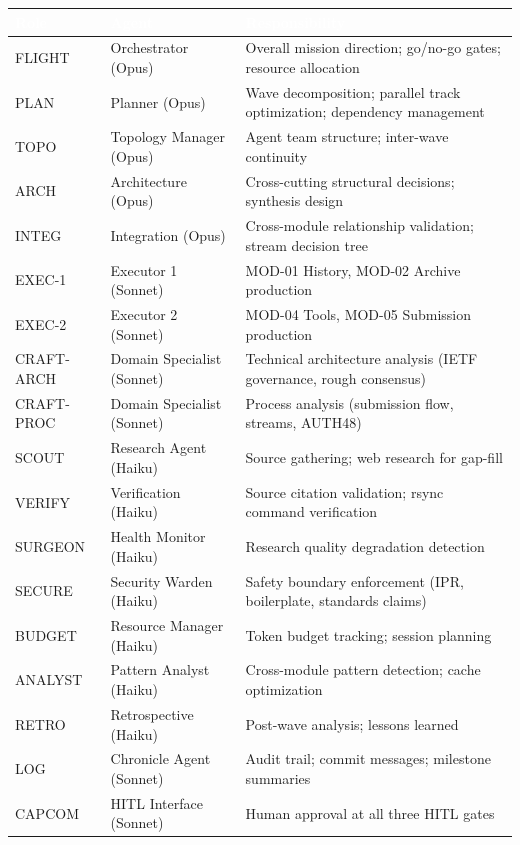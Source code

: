 \documentclass[11pt,letterpaper]{article}
\newcommand{\tableheader}[1]{\textbf{\sffamily\textcolor{white}{#1}}}
\begin{document}
\begin{center}
\begin{tabularx}{\textwidth}{L{2cm}L{3.5cm}X}
\toprule
{}
\tableheader{Role} & \tableheader{Agent} & \tableheader{Responsibility} \\
\midrule
FLIGHT & Orchestrator (Opus) & Overall mission direction; go/no-go gates; resource allocation \\
PLAN & Planner (Opus) & Wave decomposition; parallel track optimization; dependency management \\
TOPO & Topology Manager (Opus) & Agent team structure; inter-wave continuity \\
ARCH & Architecture (Opus) & Cross-cutting structural decisions; synthesis design \\
INTEG & Integration (Opus) & Cross-module relationship validation; stream decision tree \\
EXEC-1 & Executor 1 (Sonnet) & MOD-01 History, MOD-02 Archive production \\
EXEC-2 & Executor 2 (Sonnet) & MOD-04 Tools, MOD-05 Submission production \\
CRAFT-ARCH & Domain Specialist (Sonnet) & Technical architecture analysis (IETF governance, rough consensus) \\
CRAFT-PROC & Domain Specialist (Sonnet) & Process analysis (submission flow, streams, AUTH48) \\
SCOUT & Research Agent (Haiku) & Source gathering; web research for gap-fill \\
VERIFY & Verification (Haiku) & Source citation validation; rsync command verification \\
SURGEON & Health Monitor (Haiku) & Research quality degradation detection \\
SECURE & Security Warden (Haiku) & Safety boundary enforcement (IPR, boilerplate, standards claims) \\
BUDGET & Resource Manager (Haiku) & Token budget tracking; session planning \\
ANALYST & Pattern Analyst (Haiku) & Cross-module pattern detection; cache optimization \\
RETRO & Retrospective (Haiku) & Post-wave analysis; lessons learned \\
LOG & Chronicle Agent (Sonnet) & Audit trail; commit messages; milestone summaries \\
CAPCOM & HITL Interface (Sonnet) & Human approval at all three HITL gates \\
\bottomrule
\end{tabularx}
\end{center}
\end{document}
